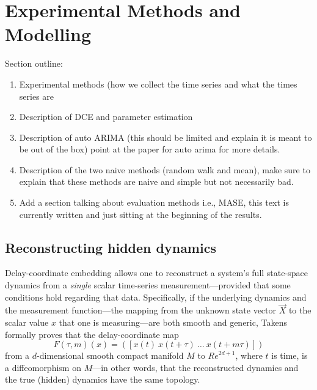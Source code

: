 \documentclass{article}
\begin{document}




\section{Experimental Methods and Modelling}\label{sec:compModel}

Section outline:

\begin{enumerate}
\item Experimental methods (how we collect the time series and what the times series are
\item Description of DCE and parameter estimation  
\item Description of auto ARIMA 
\subitem (this should be limited and explain it is meant to be out of the box) point at the paper for auto arima for more details.
\item Description of the two naive methods (random walk and mean), make sure to explain that these methods are naive and simple but not necessarily bad.
\item Add a section talking about evaluation methods i.e., MASE, this text is currently written and just sitting at the beginning of the results. 

\end{enumerate}



 \subsection{Reconstructing hidden dynamics}

Delay-coordinate embedding allows one to reconstruct a system's full
state-space dynamics from a \emph{single} scalar time-series
measurement---provided that some conditions hold regarding that data.
Specifically, if the underlying dynamics and the measurement
function---the mapping from the unknown state vector $\vec{X}$ to the
scalar value $x$ that one is measuring---are both smooth and generic,
Takens~\cite{takens} formally proves that the delay-coordinate map
\[
F(\tau,m)(x) = ([x(t) ~ x(t+\tau) ~ \dots ~x(t+m\tau)])
\]
from a $d$-dimensional smooth compact manifold $M$ to ${Re}^{2d+1}$,
where $t$ is time, is a diffeomorphism on $M$---in other words, that
the reconstructed dynamics and the true (hidden) dynamics have the
same topology.
\end{document}
